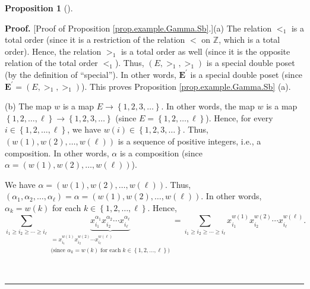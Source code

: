 \documentclass[numbers=enddot,12pt,final,onecolumn,notitlepage,abstracton]{scrartcl}
\theoremstyle{definition}
\newtheorem{prop}[theo]{Proposition}
\newenvironment{proposition}[1][]
{\begin{prop}[#1]\begin{leftbar}}
{\end{leftbar}\end{prop}}
\newenvironment{proof}[1][Proof]{\noindent\textbf{#1.} }{\ \rule{0.5em}{0.5em}}
\let\sumnonlimits\sum
\renewcommand{\sum}{\sumnonlimits\limits}
\newenvironment{verlong}{}{}
\begin{document}
\begin{verlong}
\begin{footnotesize}
\begin{proposition}
\begin{enumerate}
\end{enumerate}
\end{proposition}

\begin{proof}
[Proof of Proposition \ref{prop.example.Gamma.Sb}.](a) The relation $<_{1}$ is
a total order (since it is a restriction of the relation $<$ on $\mathbb{Z}$,
which is a total order). Hence, the relation $>_{1}$ is a total order as well
(since it is the opposite relation of the total order $<_{1}$). Thus, $\left(
E,>_{1},>_{1}\right)  $ is a special double poset (by the definition of
\textquotedblleft special\textquotedblright). In other words, $\mathbf{E}%
^{\prime}$ is a special double poset (since ${\mathbf{E}}^{\prime}=\left(
E,>_{1},>_{1}\right)  $). This proves Proposition \ref{prop.example.Gamma.Sb} (a).

(b) The map $w$ is a map $E\rightarrow\left\{  1,2,3,\ldots\right\}  $. In
other words, the map $w$ is a map $\left\{  1,2,\ldots,\ell\right\}
\rightarrow\left\{  1,2,3,\ldots\right\}  $ (since $E=\left\{  1,2,\ldots
,\ell\right\}  $). Hence, for every $i\in\left\{  1,2,\ldots,\ell\right\}  $,
we have $w\left(  i\right)  \in\left\{  1,2,3,\ldots\right\}  $. Thus,
$\left(  w\left(  1\right)  ,w\left(  2\right)  ,\ldots,w\left(  \ell\right)
\right)  $ is a sequence of positive integers, i.e., a composition. In other
words, $\alpha$ is a composition (since $\alpha=\left(  w\left(  1\right)
,w\left(  2\right)  ,\ldots,w\left(  \ell\right)  \right)  $).

We have $\alpha=\left(  w\left(  1\right)  ,w\left(  2\right)  ,\ldots
,w\left(  \ell\right)  \right)  $. Thus, $\left(  \alpha_{1},\alpha_{2}%
,\ldots,\alpha_{\ell}\right)  =\alpha=\left(  w\left(  1\right)  ,w\left(
2\right)  ,\ldots,w\left(  \ell\right)  \right)  $. In other words,
$\alpha_{k}=w\left(  k\right)  $ for each $k\in\left\{  1,2,\ldots
,\ell\right\}  $. Hence,
\begin{equation}
\sum_{i_{1}\geq i_{2}\geq\cdots\geq i_{\ell}}\underbrace{x_{i_{1}}^{\alpha
_{1}}x_{i_{2}}^{\alpha_{2}}\cdots x_{i_{\ell}}^{\alpha_{\ell}}}%
_{\substack{=x_{i_{1}}^{w\left(  1\right)  }x_{i_{2}}^{w\left(  2\right)
}\cdots x_{i_{\ell}}^{w\left(  \ell\right)  }\\\text{(since }\alpha
_{k}=w\left(  k\right)  \text{ for each }k\in\left\{  1,2,\ldots,\ell\right\}
\text{)}}}=\sum_{i_{1}\geq i_{2}\geq\cdots\geq i_{\ell}}x_{i_{1}}^{w\left(
1\right)  }x_{i_{2}}^{w\left(  2\right)  }\cdots x_{i_{\ell}}^{w\left(
\ell\right)  }. \label{pf.prop.example.Gamma.Sb.b.Malpha=}%
\end{equation}



\end{proof}
\end{footnotesize}
\end{verlong}
\end{document}
